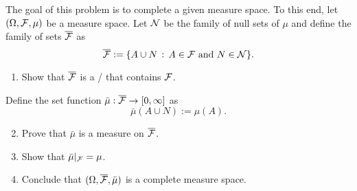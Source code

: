 \begin{problem}\label{prb:completion_measure_space}
The goal of this problem is to complete a given measure space. To this end, let $(\Omega, \mathcal F, \mu)$ be a measure space. Let $\mathcal N$ be the family of null sets of $\mu$ and define the family of sets $\overline{\mathcal F}$ as
\[
	\overline{\mathcal F} := \{A \cup N \, : \, A \in \mathcal F \text{ and } N \in \mathcal N\}.
\]
\begin{enumerate}[label=(\alph*)]
\item Show that $\overline{\mathcal F}$ is a \sigalg/ that contains $\mathcal F$.
\end{enumerate}
Define the set function $\bar{\mu} : \overline{\mathcal F} \to [0,\infty]$ as
\[
	\bar{\mu}(A \cup N) := \mu(A).
\]
\begin{enumerate}[label=(\alph*)]
\setcounter{enumi}{1}
\item Prove that $\bar{\mu}$ is a measure on $\overline{\mathcal F}$.
\item Show that $\bar{\mu}|_{\mathcal F} = \mu$.
\item Conclude that $(\Omega, \overline{\mathcal F}, \bar{\mu})$ is a complete measure space.
\end{enumerate}
\end{problem}




